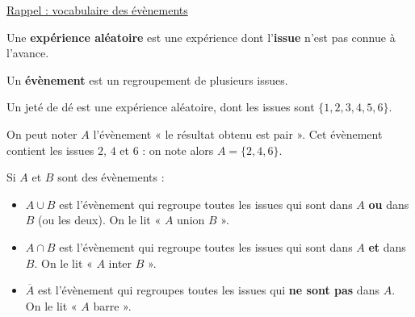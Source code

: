\documentclass[noheader]{coursclass}
\begin{document}
\begin{center}
	\LARGE
	\uline{Rappel : vocabulaire des évènements}
	\vspace{1em}
\end{center}

\begin{definition}
	Une \textbf{expérience aléatoire} est une expérience dont l'\textbf{issue} n'est pas connue à l'avance.

	Un \textbf{évènement} est un regroupement de plusieurs issues.
\end{definition}

\begin{exemple}
	Un jeté de dé est une expérience aléatoire, dont les issues sont $\{1, 2, 3, 4, 5, 6\}$.

	On peut noter $A$ l'évènement « le résultat obtenu est pair ». Cet évènement contient les issues $2$, $4$ et $6$ : on note alors $A = \{2, 4, 6\}$.
\end{exemple}

\begin{definition}
	Si $A$ et $B$ sont des évènements :
	\begin{itemize}
		\item $A ∪ B$ est l'évènement qui regroupe toutes les issues qui sont dans $A$ \textbf{ou} dans $B$ (ou les deux). On le lit « $A$ union $B$ ».
		\item $A ∩ B$ est l'évènement qui regroupe toutes les issues qui sont dans $A$ \textbf{et} dans $B$. On le lit « $A$ inter $B$ ».
		\item $\overline{A}$ est l'évènement qui regroupes toutes les issues qui \textbf{ne sont pas} dans $A$. On le lit « $A$ barre ».
	\end{itemize}

	\begin{center}
	\end{center}
\end{definition}
\end{document}
